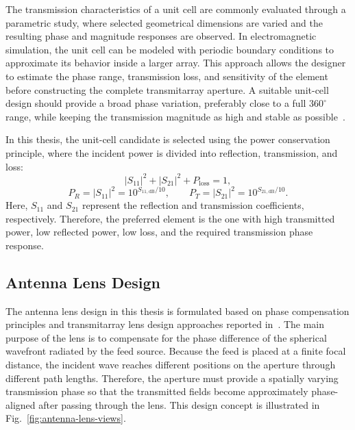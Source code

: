 The transmission characteristics of a unit cell are commonly evaluated through a parametric study, where selected geometrical dimensions are varied and the resulting phase and magnitude responses are observed. In electromagnetic simulation, the unit cell can be modeled with periodic boundary conditions to approximate its behavior inside a larger array. This approach allows the designer to estimate the phase range, transmission loss, and sensitivity of the element before constructing the complete transmitarray aperture. A suitable unit-cell design should provide a broad phase variation, preferably close to a full $360^\circ$ range, while keeping the transmission magnitude as high and stable as possible~\cite{Abdelrahman2017}.

In this thesis, the unit-cell candidate is selected using the power conservation principle, where the incident power is divided into reflection, transmission, and loss:
\begin{equation}
    \left|S_{11}\right|^2 + \left|S_{21}\right|^2 + P_{\mathrm{loss}} = 1,
\end{equation}
\begin{equation}
    P_R = \left|S_{11}\right|^2 = 10^{S_{11,\mathrm{dB}}/10}, \qquad
    P_T = \left|S_{21}\right|^2 = 10^{S_{21,\mathrm{dB}}/10}.
\end{equation}
Here, $S_{11}$ and $S_{21}$ represent the reflection and transmission coefficients, respectively. Therefore, the preferred element is the one with high transmitted power, low reflected power, low loss, and the required transmission phase response.



\subsection{Antenna Lens Design}
The antenna lens design in this thesis is formulated based on phase compensation principles and transmitarray lens design approaches reported in~\cite{RezkiElArif2023,Al-Joumayly2011,Abdelrahman2017}. The main purpose of the lens is to compensate for the phase difference of the spherical wavefront radiated by the feed source. Because the feed is placed at a finite focal distance, the incident wave reaches different positions on the aperture through different path lengths. Therefore, the aperture must provide a spatially varying transmission phase so that the transmitted fields become approximately phase-aligned after passing through the lens. This design concept is illustrated in Fig.~\ref{fig:antenna-lens-views}.

